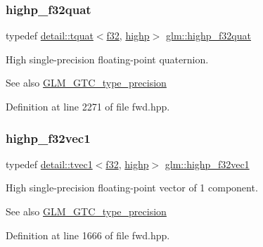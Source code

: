 \subsubsection{\texorpdfstring{highp\+\_\+f32quat}{highp\_f32quat}}
{\footnotesize\ttfamily typedef \hyperlink{structglm_1_1detail_1_1tquat}{detail\+::tquat}$<$\hyperlink{group__gtc__type__precision_ga0ec999b57f5330d9021256e96038df04}{f32}, \hyperlink{namespaceglm_a0f04f086094c747d227af4425893f545ac6f7eab42eacbb10d59a58e95e362074}{highp}$>$ \hyperlink{group__gtc__type__precision_ga26eef27d2efbd759e7e93c40672402e9}{glm\+::highp\+\_\+f32quat}}

High single-\/precision floating-\/point quaternion. \begin{DoxySeeAlso}{See also}
\hyperlink{group__gtc__type__precision}{G\+L\+M\+\_\+\+G\+T\+C\+\_\+type\+\_\+precision} 
\end{DoxySeeAlso}


Definition at line 2271 of file fwd.\+hpp.

\mbox{\label{group__gtc__type__precision_gac8be8ce31b9df0a5005d7c7458a3d03e}} 
\subsubsection{\texorpdfstring{highp\+\_\+f32vec1}{highp\_f32vec1}}
{\footnotesize\ttfamily typedef \hyperlink{structglm_1_1detail_1_1tvec1}{detail\+::tvec1}$<$\hyperlink{group__gtc__type__precision_ga0ec999b57f5330d9021256e96038df04}{f32}, \hyperlink{namespaceglm_a0f04f086094c747d227af4425893f545ac6f7eab42eacbb10d59a58e95e362074}{highp}$>$ \hyperlink{group__gtc__type__precision_gac8be8ce31b9df0a5005d7c7458a3d03e}{glm\+::highp\+\_\+f32vec1}}

High single-\/precision floating-\/point vector of 1 component. \begin{DoxySeeAlso}{See also}
\hyperlink{group__gtc__type__precision}{G\+L\+M\+\_\+\+G\+T\+C\+\_\+type\+\_\+precision} 
\end{DoxySeeAlso}


Definition at line 1666 of file fwd.\+hpp.

\mbox{\label{group__gtc__type__precision_gabba3e1b3ae0bcaa7aaac573c08c2f8d3}} 
